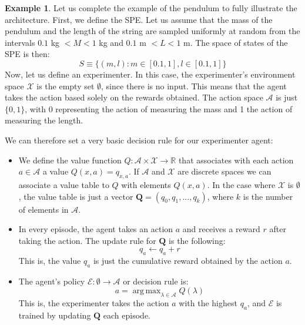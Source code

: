 \documentclass[11pt,a4paper,twoside]{report}
\DeclareMathOperator*{\argmax}{arg\,max}
\newcommand{\+}{\textnormal{+} }
\theoremstyle{definition}
\newtheorem{myex}[mythm]{Example}
\numberwithin{equation}{chapter}
\begin{document}
\begin{myex}
Let us complete the example of the pendulum to fully illustrate the architecture.
First, we define the SPE. Let us assume that the mass of the pendulum and the
length of the string are sampled uniformly at random from the intervals \break
$0.1$ kg $< M < 1$ kg and $ 0.1$ m $<L<1 $ m. The space of states of the SPE
is then:
 \begin{equation}
  S\equiv \{(m,l):m \in \left[0.1, 1\right],l \in [0.1,1]\}
 \end{equation}
Now, let us define an experimenter. In this case, the experimenter's environment
space $\mathcal{X}$ is the empty set $\emptyset$, since there is no input. This
means that the agent takes the action based solely on the rewards obtained. The
action space $\mathcal{A}$ is just $\{0,1\}$, with 0 representing the action of
measuring the mass and 1 the action of measuring the length.

We can therefore set a very basic decision rule for our experimenter agent:

\begin{itemize}
  \item We define the value function $Q:\mathcal{A}\times
  \mathcal{X}\rightarrow\mathbb{R}$ that associates with each action $a \in
  \mathcal{A}$ a value $Q(x,a)=q_{x,a}$. If $\mathcal{A}$ and $\mathcal{X}$ are discrete
  spaces we can associate a value table to $Q$ with elements $Q(x,a)$. In the 
  case where $\mathcal{X}$ is $\emptyset$, the value table is just a vector 
  $\mathbb{\textbf{Q}}=(q_0,q_1,...,q_{k})$, where $k$ is the number of elements
  in $\mathcal{A}.$
  \item  In every episode, the agent takes an action $a$ and receives a reward $r$
  after taking the action.
  The update rule for $\textbf{Q}$ is the following:
  \begin{equation}
    q_a\leftarrow q_a + r
    \label{update_rule1}
  \end{equation}
  This is, the value $q_a$ is just the cumulative reward obtained by the 
  action $a$. 
  \item The agent's policy $\mathscr{E}:\emptyset  \rightarrow \mathcal{A}$ or 
  decision rule is:
  \begin{equation}
    a = \argmax_{\lambda \in \mathcal{A}} Q(\lambda)
    \label{argmax_policy}
  \end{equation}
  This is, the experimenter takes the action $a$ with the highest $q_a$, and 
  $\mathscr{E}$ is trained by updating $\textbf{Q}$ each episode.
\end{itemize}


\end{myex}
\end{document}
